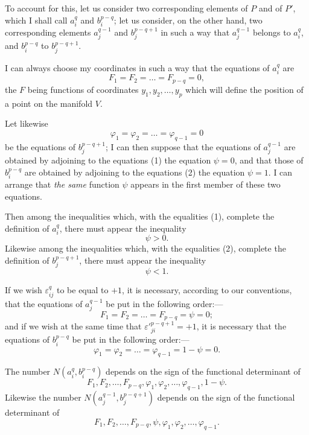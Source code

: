 \documentclass{article}
\begin{document}
To account for this, let us consider two corresponding elements of $P$ and of $P'$, which I shall call $a^{q}_{i}$ and $b^{p-q}_{i}$; let us consider, on the other hand, two corresponding elements $a^{q-1}_{j}$ and $b^{p-q+1}_{j}$ in such a way that $a^{q-1}_{j}$ belongs to $a^{q}_{i}$, and $b^{p-q}_{i}$ to $b^{p-q+1}_{j}$.

I can always choose my coordinates in such a way that the equations of $a^{q}_{i}$ are
\[ F_{1} = F_{2} = \ldots = F_{p-q} = 0, \tag{3} \]
the $F$ being functions of coordinates $y_{1}, y_{2}, \ldots, y_{p}$ which will define the position of a point on the manifold $V$.

Let likewise
\[ \varphi_{1} = \varphi_{2} = \ldots = \varphi_{q-1} = 0 \tag{4} \]
be the equations of $b^{p-q+1}_{j}$; I can then suppose that the equations of $a^{q-1}_{j}$ are obtained by adjoining to the equations (1) the equation $\psi = 0$, and that those of $b^{p-q}_{i}$ are obtained by adjoining to the equations (2) the equation $\psi = 1$. I can arrange that \emph{the same} function $\psi$ appears in the first member of these two equations.

Then among the inequalities which, with the equalities (1), complete the definition of $a^{q}_{i}$, there must appear the inequality
\[ \psi > 0. \]
Likewise among the inequalities which, with the equalities (2), complete the definition of $b^{p-q+1}_{j}$, there must appear the inequality
\[ \psi < 1. \]

If we wish $\varepsilon^{q}_{ij}$ to be equal to $+1$, it is necessary, according to our conventions, that the equations of $a^{q-1}_{j}$ be put in the following order:---
\[ F_{1} = F_{2} = \ldots = F_{p-q} = \psi = 0; \]
and if we wish at the same time that $\varepsilon'^{p-q+1}_{ji} = +1$, it is necessary that the equations of $b^{p-q}_{i}$ be put in the following order:---
\[ \varphi_{1} = \varphi_{2} = \ldots = \varphi_{q-1} = 1 - \psi = 0. \]

The number $N(a^{q}_{i}, b^{p-q}_{i})$ depends on the sign of the functional determinant of
\[ F_{1}, F_{2}, \ldots, F_{p-q}, \varphi_{1}, \varphi_{2}, \ldots, \varphi_{q-1}, 1 - \psi. \]
Likewise the number $N(a^{q-1}_{j}, b^{p-q+1}_{j})$ depends on the sign of the functional determinant of
\[ F_{1}, F_{2}, \ldots, F_{p-q}, \psi, \varphi_{1}, \varphi_{2}, \ldots, \varphi_{q-1}. \]
\end{document}
